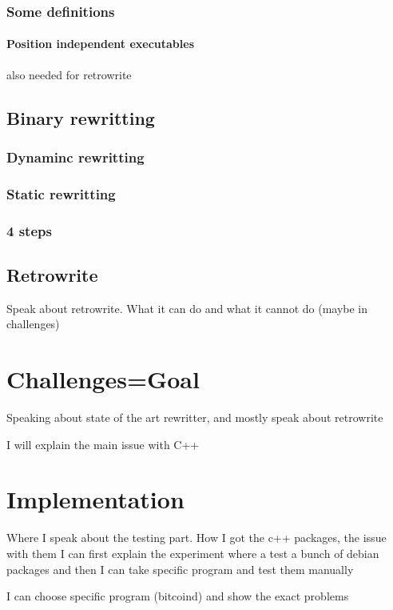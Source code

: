 \documentclass[a4paper,11pt,oneside]{report}
\begin{document}
\subsection{Some definitions}
\subsubsection{Position independent executables}
also needed for retrowrite

\section{Binary rewritting}
\subsection{Dynaminc rewritting}
\subsection{Static rewritting}
\subsection{4 steps}


\section{Retrowrite}
Speak about retrowrite. What it can do and what it cannot do (maybe in challenges)



\chapter{Challenges=Goal}
Speaking about state of the art rewritter, and mostly
speak about retrowrite

I will explain the main issue with C++

\chapter{Implementation}
Where I speak about the testing part. How I got the c++ packages, the issue with them
I can first explain the experiment where a test a bunch of debian packages and
then I can take specific program and test them manually

I can choose specific program (bitcoind) and show the exact problems
\end{document}
